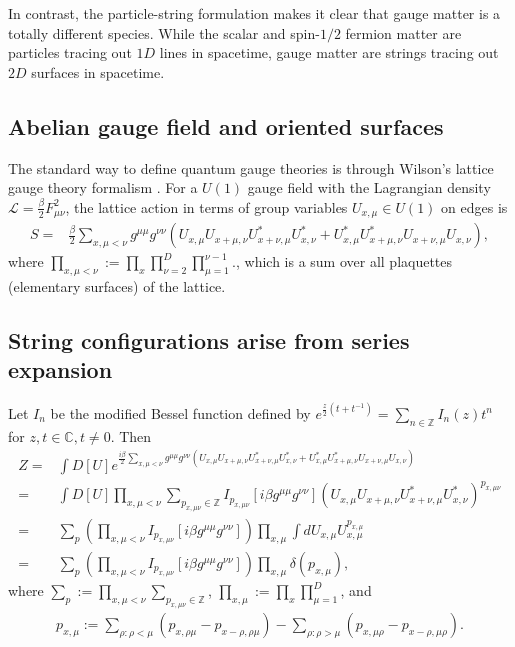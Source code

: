 \documentclass[12pt]{article}
\theoremstyle{definition}
\begin{document}
In contrast, the particle-string formulation makes it clear that gauge matter is a totally different species. While the scalar and spin-$1/2$ fermion matter are particles tracing out $1D$ lines in spacetime, gauge matter are strings tracing out $2D$ surfaces in spacetime. 

\subsection{Abelian gauge field and oriented surfaces}\label{sec:u1gt}

The standard way to define quantum gauge theories is through Wilson's lattice gauge theory formalism \cite{Wilson1974ConfinementQuarks}. For a $U(1)$ gauge field with the Lagrangian density $\mathcal{L}= \frac{\beta}{2} F_{\mu\nu}^2$, the lattice action in terms of group variables $U_{x,\mu}\in U(1)$ on edges is
\begin{align}
S= & \frac{\beta}{2} \sum_{x, \mu<\nu} g^{\mu\mu} g^{\nu\nu} (U_{x,\mu}U_{x+\mu,\nu} U_{x+\nu,\mu}^* U_{x,\nu}^* + U_{x,\mu}^* U_{x+\mu,\nu}^* U_{x+\nu,\mu} U_{x,\nu}),
\end{align}
where $\prod_{x,\mu<\nu}:= \prod_x \prod_{\nu=2}^D \prod_{\mu=1}^{\nu-1}$., which is a sum over all plaquettes (elementary surfaces) of the lattice.

\subsection*{String configurations arise from series expansion}
Let $I_n$ be the modified Bessel function defined by $e^{\frac{z}{2}(t+t^{-1})}=\sum_{n\in\mathbb{Z}} I_n(z) t^n$ for $z,t\in \mathbb{C}, t\ne 0$. Then \cite{Gattringer2016ApproachesTheory}
\begin{align}
Z =& \int D[U] e^{\frac{i\beta}{2} \sum_{x, \mu<\nu}  g^{\mu\mu} g^{\nu\nu} (U_{x,\mu}U_{x+\mu,\nu} U_{x+\nu,\mu}^* U_{x,\nu}^* + U_{x,\mu}^* U_{x+\mu,\nu}^* U_{x+\nu,\mu} U_{x,\nu})}
\label{eq:zu1g1}
\\
=& \int D[U] \prod_{x,\mu<\nu} \sum_{p_{x,\mu\nu}\in\mathbb{Z}} I_{p_{x,\mu\nu}}[i \beta g^{\mu\mu} g^{\nu\nu}] (U_{x,\mu}U_{x+\mu,\nu} U_{x+\nu,\mu}^* U_{x,\nu}^*)^{p_{x,\mu\nu}}
\\
=& \sum_{p} (\prod_{x,\mu<\nu} I_{p_{x,\mu\nu}}[i \beta g^{\mu\mu} g^{\nu\nu}]) \prod_{x,\mu} \int d U_{x,\mu} U_{x,\mu}^{p_{x,\mu}}
\label{eq:zu1g2}
\\
=& \sum_{p} (\prod_{x,\mu<\nu} I_{p_{x,\mu\nu}}[i \beta g^{\mu\mu} g^{\nu\nu}]) \prod_{x,\mu} \delta(p_{x,\mu}),
\label{eq:zu1g}
\end{align}
where $\sum_p:=\prod_{x,\mu<\nu} \sum_{p_{x,\mu\nu}\in\mathbb{Z}}$, $\prod_{x,\mu}:= \prod_x \prod_{\mu=1}^D$, and
\begin{align}\label{eq:pxmu}
p_{x,\mu}:=\sum_{\rho:\rho<\mu} (p_{x,\rho\mu}-p_{x-\rho,\rho\mu})-\sum_{\rho:\rho>\mu} (p_{x,\mu\rho}-p_{x-\rho,\mu\rho}).
\end{align}
\end{document}
